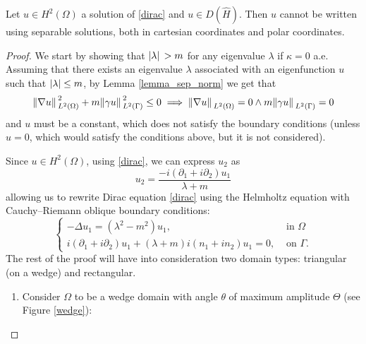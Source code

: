 \begin{proposition}\label{dirac_not_polar}
    Let \(u \in H^2(\Omega)\) a solution of \eqref{dirac} and \(u \in D(\hat{H})\). Then \(u\) cannot be written using separable solutions, both in cartesian coordinates and polar coordinates.
\end{proposition}
\begin{proof}
    We start by showing that \(\abs*{\lambda}>m\) for any eigenvalue \(\lambda\) if \(\kappa = 0\) a.e. Assuming that there exists an eigenvalue \(\lambda\) associated with an eigenfunction \(u\) such that \(\abs{\lambda} \leq m\), by Lemma \ref{lemma_sep_norm} we get that 
    \[
    \norm*{\nabla u }_{L^2(\Omega)}^2 + m \norm*{\gamma u}_{L^2(\Gamma)}^2 \leq 0 \implies \norm*{\nabla u }_{L^2(\Omega)} = 0 \land m \norm*{\gamma u}_{L^2(\Gamma)} = 0
    \]
    and \(u\) must be a constant, which does not satisfy the boundary conditions (unless \(u=0\), which would satisfy the conditions above, but it is not considered).

    Since \(u \in H^2(\Omega)\), using \eqref{dirac}, we can express \(u_2\) as
    \[
    u_2 = \frac{-i (\partial_1 + i\partial_2)u_1}{\lambda + m}    
    \]
    allowing us to rewrite Dirac equation \eqref{dirac} using the Helmholtz equation with Cauchy–Riemann oblique boundary conditions:
    \begin{equation}\label{helm_system}
        \begin{cases}
            -\Delta u_1 = (\lambda^2 - m^2)u_1, & \text{ in } \Omega\\
             i (\partial_1 + i\partial_2)u_1 + (\lambda + m)i(n_1 + i n_2)u_1 = 0, & \text{ on } \Gamma.
        \end{cases}      
    \end{equation}
    The rest of the proof will have into consideration two domain types: triangular (on a wedge) and rectangular.
    \begin{enumerate}

    \item Consider \(\Omega\) to be a wedge domain with angle \(\theta\) of maximum amplitude \(\Theta\) (see Figure \ref{wedge}):
    
    \begin{figure}[H]
    \centering
\end{figure}
\end{enumerate}
\end{proof}
